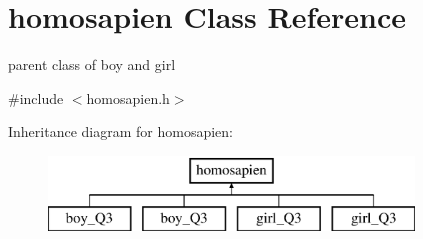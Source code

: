 \hypertarget{classhomosapien}{}\section{homosapien Class Reference}
\label{classhomosapien}


parent class of boy and girl  




{\ttfamily \#include $<$homosapien.\+h$>$}

Inheritance diagram for homosapien\+:\begin{figure}[H]
\begin{center}
\leavevmode
\includegraphics[height=2.000000cm]{classhomosapien}
\end{center}
\end{figure}
